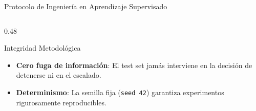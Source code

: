 \documentclass[10pt,aspectratio=169]{beamer}
\begin{document}
\begin{frame}{Protocolo de Ingeniería en Aprendizaje Supervisado}
\begin{columns}[T]
    \begin{column}{0.48\textwidth}
      \begin{block}{Integridad Metodológica}
        \scriptsize
        \begin{itemize}
          \item \textbf{Cero fuga de información}: El test set jamás interviene en la decisión de detenerse ni en el escalado.
          \item \textbf{Determinismo}: La semilla fija (\texttt{seed 42}) garantiza experimentos rigurosamente reproducibles.
        \end{itemize}
      \end{block}
    \end{column}
  \end{columns}
\end{frame}
\end{document}
